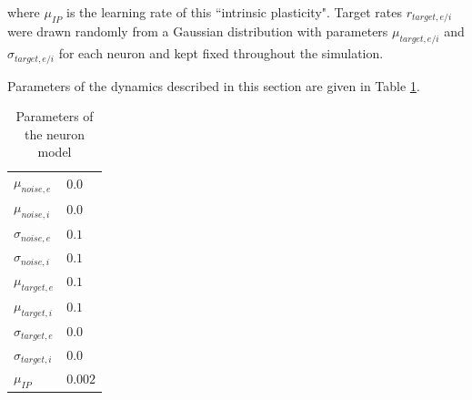 \documentclass[10pt,a4paper]{article}
\begin{document}
where $\mu_{IP}$ is the learning rate of this ``intrinsic plasticity". Target rates $r_{target,e/i}$ were drawn randomly from a Gaussian distribution with parameters $\mu_{target,e/i}$ and $\sigma_{target,e/i}$ for each neuron and kept fixed throughout the simulation.

Parameters of the dynamics described in this section are given in Table \ref{tab:neuron_params}.
\begin{table}
\caption{Parameters of the neuron model}
\begin{tabular}{ll}
$\mu_{noise,e}$ & $0.0$ \\
$\mu_{noise,i}$ & $0.0$ \\
$\sigma_{noise,e}$ & $0.1$ \\
$\sigma_{noise,i}$ & $0.1$ \\
$\mu_{target,e}$ & $0.1$ \\
$\mu_{target,i}$ & $0.1$ \\
$\sigma_{target,e}$ & $0.0$ \\
$\sigma_{target,i}$ & $0.0$ \\
$\mu_{IP}$ & $0.002$
\end{tabular}
\label{tab:neuron_params}
\end{table}

\end{document}
